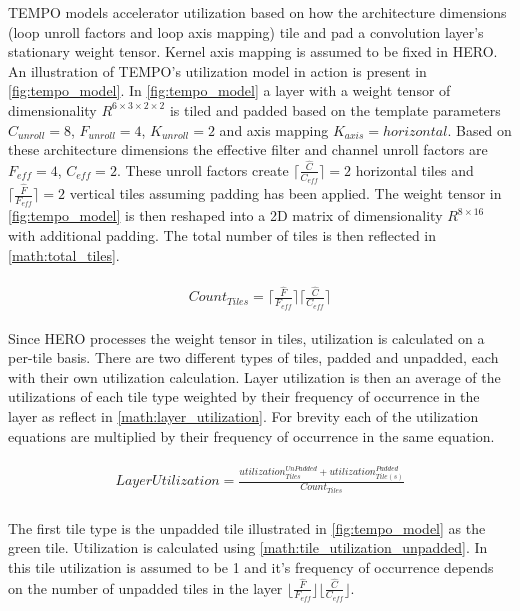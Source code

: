 TEMPO models accelerator utilization based on how the architecture dimensions (loop
unroll factors and loop axis mapping) tile and pad a convolution layer's
stationary weight tensor.  Kernel axis mapping is assumed to be fixed in HERO. An illustration of TEMPO's
utilization model in action is present in \autoref{fig:tempo_model}. In
\autoref{fig:tempo_model} a layer with a weight tensor of dimensionality
$R^{6\times 3\times 2\times 2}$ is tiled and padded based on the template
parameters $C_{unroll}=8$, $F_{unroll}=4$, $K_{unroll}=2$ and axis mapping
$K_{axis} = horizontal$. Based on these architecture dimensions the effective filter
and channel unroll factors are $F_{eff} = 4$, $C_{eff}=2$. These unroll factors
create $\lceil \frac{\hat{C}}{C_{eff}} \rceil = 2$ horizontal tiles and $\lceil
\frac{\hat{F}}{F_{eff}} \rceil = 2$ vertical tiles assuming padding has been
applied. The weight tensor in \autoref{fig:tempo_model} is then reshaped into a
2D matrix of dimensionality $R^{8\times 16}$ with additional padding. The total
number of tiles is then reflected in \autoref{math:total_tiles}. 

\begin{align}
    \begin{gathered}
        Count_{Tiles} = \lceil \frac{\hat{F}}{F_{eff}} \rceil \lceil \frac{\hat{C}}{C_{eff}} \rceil
        \end{gathered}
    \label{math:total_tiles}
\end{align}

Since HERO processes the weight tensor in tiles, utilization is calculated on a
per-tile basis. There are two different types of tiles, padded and unpadded,
each with their own utilization calculation. Layer utilization is then an
average of the utilizations of each tile type weighted by their frequency of
occurrence in the layer as reflect in \autoref{math:layer_utilization}. For
brevity each of the utilization equations are multiplied by their frequency of
occurrence in the same equation. 

\begin{align}
    \begin{gathered}
        LayerUtilization = \frac{utilization^{UnPadded}_{Tiles} + utilization^{Padded}_{Tile(s)}}{Count_{Tiles}} \\
            \end{gathered}
    \label{math:layer_utilization}
\end{align}

The first tile type is the unpadded tile illustrated in
\autoref{fig:tempo_model} as the green tile. Utilization is calculated using
\autoref{math:tile_utilization_unpadded}. In this tile utilization is assumed to
be 1 and it's frequency of occurrence depends on the number of unpadded tiles in
the layer $\lfloor \frac{\hat{F}}{F_{eff}} \rfloor \lfloor
\frac{\hat{C}}{C_{eff}}\rfloor$. 

